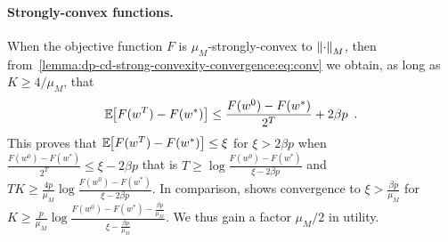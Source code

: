 \paragraph{Strongly-convex functions.}

When the objective function $F$ is $\mu_M$-strongly-convex \wrt to $\left \lVert \cdot \right \rVert_M$, then
from~\eqref{lemma:dp-cd-strong-convexity-convergence:eq:conv} we obtain, as long
as $K \ge 4/\mu_M$, that
\begin{align}
  \mathbb E_{} \hspace{-0.29em} \left[ F(w^T) - F(w^*) \right] \le \frac{F(w^0) - F(w^*)}{2^T} + 2 \beta p\enspace.
\end{align}
This proves that $\mathbb E_{} \hspace{-0.29em} \left[ F(w^T) - F(w^*) \right] \le \xi$ for $\xi > 2\beta p$ when
$\frac{F(w^0) - F(w^*)}{2^T} \le \xi - 2 \beta p$ that is
$T \ge \log\frac{F(w^0) - F(w^*)}{\xi - 2\beta p}$ and
$TK \ge \frac{4p}{\mu_M}\log\frac{F(w^0) - F(w^*)}{\xi - 2\beta p}$.
In comparison, \citet[Theorem 5.2 therein]{tappenden2016Inexact} shows
convergence
to $\xi > \frac{\beta p}{\mu_M}$ for
$K \ge \frac{p}{\mu_M} \log \frac{F(w^0) - F(w^*) - \frac{\beta p}{\mu_M}}{\xi - \frac{\beta p}{\mu_M} }$.
We thus gain a factor $\mu_M/2$ in utility.












